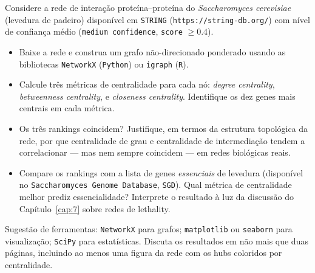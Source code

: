 \begin{exercicio}[$\star$] Considere a rede de interação proteína--proteína do \emph{Saccharomyces cerevisiae} (levedura de padeiro) disponível em \texttt{STRING} (\texttt{https://string-db.org/}) com nível de confiança médio (\texttt{medium confidence}, \texttt{score} \(\geq 0.4\)). 
\begin{itemize}
  \item[(a)] Baixe a rede e construa um grafo não-direcionado ponderado usando as bibliotecas \texttt{NetworkX} (\texttt{Python}) ou \texttt{igraph} (\texttt{R}).
  \item[(b)] Calcule três métricas de centralidade para cada nó: \emph{degree centrality}, \emph{betweenness centrality}, e \emph{closeness centrality}. Identifique os dez genes mais centrais em cada métrica.
  \item[(c)] Os três rankings coincidem? Justifique, em termos da estrutura topológica da rede, por que centralidade de grau e centralidade de intermediação tendem a correlacionar --- mas nem sempre coincidem --- em redes biológicas reais.
  \item[(d)] Compare os rankings com a lista de genes \emph{essenciais} de levedura (disponível no \texttt{Saccharomyces Genome Database}, \texttt{SGD}). Qual métrica de centralidade melhor prediz essencialidade? Interprete o resultado à luz da discussão do Capítulo~\ref{cap:7} sobre redes de lethality.
\end{itemize}
Sugestão de ferramentas: \texttt{NetworkX} para grafos; \texttt{matplotlib} ou \texttt{seaborn} para visualização; \texttt{SciPy} para estatísticas. Discuta os resultados em não mais que duas páginas, incluindo ao menos uma figura da rede com os hubs coloridos por centralidade.
\end{exercicio}



